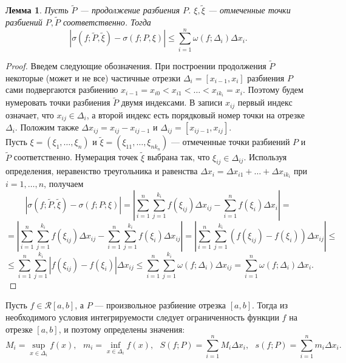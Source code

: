 \documentclass[12pt]{report}
\numberwithin{equation}{section}
\newtheorem{lemma}{Лемма}[section]
\begin{document}
\begin{lemma}
Пусть $\tilde{P}$ --- продолжение разбиения $P$. $\xi, \tilde{\xi}$ --- отмеченные точки разбиений $P, \tilde{P}$ соответственно. Тогда
\begin{equation}\label{eq:5:1}
\left|\sigma(f; \tilde{P}, \tilde{\xi}) - \sigma(f; P, \xi)\right| \leqslant \sum_{i=1}^n \omega (f; \Delta_i) \Delta x_i. 
\end{equation}
\end{lemma}
\begin{proof}
Введем следующие обозначения. При построении продолжения $\tilde{P}$ некоторые (может и не все) частичные отрезки $\Delta_i = [x_{i-1}, x_i]$ разбиения $P$ сами подвергаются разбиению $x_{i-1} = x_{i0} < x_{i1} < \ldots < x_{ik_i} = x_i$. Поэтому будем нумеровать точки разбиения $\tilde{P}$  двумя индексами. В записи $x_{ij}$ первый индекс означает, что $x_{ij}  \in \Delta_i$, а второй индекс есть порядковый номер точки на отрезке $\Delta_i$. Положим также $\Delta x_{ij} = x_{ij} - x_{ij - 1}$ и $\Delta_{ij} = [x_{ij - 1}, x_{ij}]$.\\

Пусть $\xi = (\xi_1, \ldots, \xi_n)$ и $\tilde{\xi} = (\xi_{11}, \ldots, \xi_{nk_n})$  --- отмеченные точки разбиений $P$ и $\tilde{P}$ соответственно. Нумерация точек $\tilde{\xi}$ выбрана так, что $\xi_{ij} \in \Delta_{ij}$. Используя определения, неравенство треугольника и равенства $\Delta x_i = \Delta x_{i1} + \ldots + \Delta x_{ik_i}$ при $i = 1, \ldots, n$, получаем
\[ | \sigma(f; \tilde{P}, \tilde{\xi}) - \sigma(f; P; \xi) | = \left| \sum_{i=1}^n \sum_{j=1}^{k_i} f(\xi_{ij}) \Delta x_{ij} - \sum_{i=1}^n f(\xi_i) \Delta x_{i}  \right| =\]
\[= \left| \sum_{i=1}^n \sum_{j=1}^{k_i}f(\xi_{ij}) \Delta x_{ij} - \sum_{i=1}^n \sum_{j=1}^{k_i} f(\xi_i) \Delta x_{ij} \right| = \left| \sum_{i=1}^n \sum_{j=1}^{k_i} (f(\xi_{ij}) - f(\xi_i)) \Delta x_{ij} \right| \leqslant \]
\[ \leqslant \sum_{i=1}^n \sum_{j=1}^{k_i} \left| f(\xi_{ij}) - f(\xi_i) \right| \Delta x_{ij} \leqslant \sum_{i=1}^n \sum_{j=1}^{k_i} \omega(f; \Delta_i) \Delta x_{ij} = \sum_{i=1}^n \omega (f; \Delta_i) \Delta x_i. \]
\end{proof}

Пусть $f \in \mathcal{R}[a,b]$, а $P$ --- произвольное разбиение отрезка $[a,b]$. Тогда из необходимого условия интегрируемости следует ограниченность функции $f$ на отрезке $[a,b]$, и поэтому определены значения:
\[ M_i = \sup_{x \in \Delta_i} f(x),~~~ m_i = \inf_{x \in \Delta_i} f(x),~~~ S(f;P) = \sum_{i = 1}^n M_i \Delta x_i, ~~~ s(f; P) = \sum_{i = 1}^n m_i \Delta x_i.\]
\end{document}
